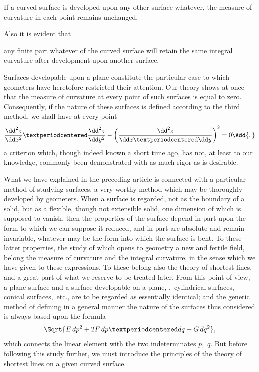\begin{Theorem}
If a curved surface is developed upon any other surface whatever, the
measure of curvature in each point remains unchanged.
\end{Theorem}

Also it is evident that
\begin{Theorem}[]
any finite part whatever of the curved surface will retain the
same integral curvature after development upon another surface.
\end{Theorem}

Surfaces developable upon a plane constitute the particular case to which geometers
have heretofore restricted their attention. Our theory shows at once that the
measure of curvature at every point of such surfaces is equal to zero. Consequently,
if the nature of these surfaces is defined according to the third method, we shall have
at every point
\[
\frac{\dd^{2} z}{\dd x^{2}}·\frac{\dd^{2} z}{\dd y^{2}}
  - \left(\frac{\dd^{2}z}{\dd x·\dd y}\right)^{2} = 0\Add{,}
\]
a criterion which, though indeed known a short time ago, has not, at least to our
knowledge, commonly been demonstrated with as much rigor as is desirable.



What we have explained in the preceding article is connected with a particular
method of studying surfaces, a very worthy method which may be thoroughly developed
by geometers. When a surface is regarded, not as the boundary of a solid, but
as a flexible, though not extensible solid, one dimension of which is supposed to
vanish, then the properties of the surface depend in part upon the form to which we
can suppose it reduced, and in part are absolute and remain invariable, whatever may
be the form into which the surface is bent. To these latter properties, the study of
which opens to geometry a new and fertile field, belong the measure of curvature and
the integral curvature, in the sense which we have given to these expressions. To
these belong also the theory of shortest lines, and a great part of what we reserve to
be treated later. From this point of view, a plane surface and a surface developable
on a plane, \eg,~cylindrical surfaces, conical surfaces,~etc., are to be regarded as essentially
identical; and the generic method of defining in a general manner the nature of
the surfaces thus considered is always based upon the formula
\[
\Sqrt{E\, dp^{2} + 2F\, dp·dq + G\, dq^{2}},
\]
which connects the linear element with the two indeterminates $p$,~$q$. But before following
this study further, we must introduce the principles of the theory of shortest
lines on a given curved surface.


